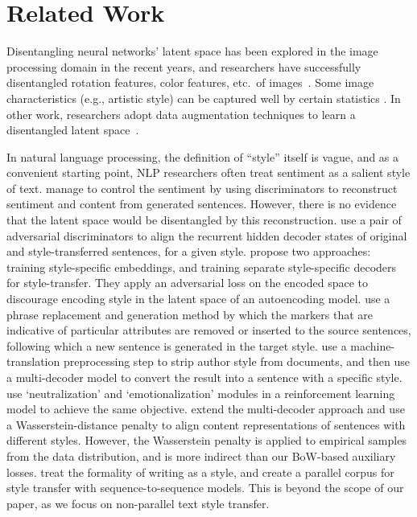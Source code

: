 \documentclass[letterpaper]{article} %
\begin{document}
\section{Related Work}

Disentangling neural networks' latent space has been explored in the image processing domain in the recent years, and researchers have successfully disentangled rotation features, color features, etc.~of images~\cite{chen2016infogan,luan2017deep}.
Some image characteristics (e.g., artistic style) can be captured well by certain statistics \cite{gatys2016image}.
In other work, researchers adopt data augmentation techniques to learn a disentangled latent space~\cite{kulkarni2015deep,champandard2016semantic}.

In natural language processing, the definition of ``style'' itself is vague, and as a convenient starting point, NLP researchers often treat sentiment as a salient style of text.
\citet{hu2017toward} manage to control the sentiment by using discriminators to reconstruct sentiment and content from generated sentences.
However, there is no evidence that the latent space would be disentangled by this reconstruction.
\citet{shen2017style} use a pair of adversarial discriminators to align the recurrent hidden decoder states of original and style-transferred sentences, for a given style.
\citet{fu2018style} propose two approaches: training style-specific embeddings, and training separate style-specific decoders for style-transfer. They apply an adversarial loss on the encoded space to discourage encoding style in the latent space of an autoencoding model.
\citet{li2018delete} use a phrase replacement and generation method by which the markers that are indicative of particular attributes are removed or inserted to the source sentences, following which a new sentence is generated in the target style.
\citet{prabhumoye2018style} use a machine-translation preprocessing step to strip author style from documents, and then use a multi-decoder model to convert the result into a sentence with a specific style.
\citet{xu2018unpaired} use `neutralization' and `emotionalization' modules in a reinforcement learning model to achieve the same objective.
\citet{zhao2018adversarially} extend the multi-decoder approach and use a Wasserstein-distance penalty to align content representations of sentences with different styles. However, the Wasserstein penalty is applied to  empirical samples from the data distribution, and is more indirect than our BoW-based auxiliary losses.
\citet{rao2018dear} treat the formality of writing as a style, and create a parallel corpus for style transfer with sequence-to-sequence models. This is beyond the scope of our paper, as we focus on non-parallel text style transfer.
\end{document}
